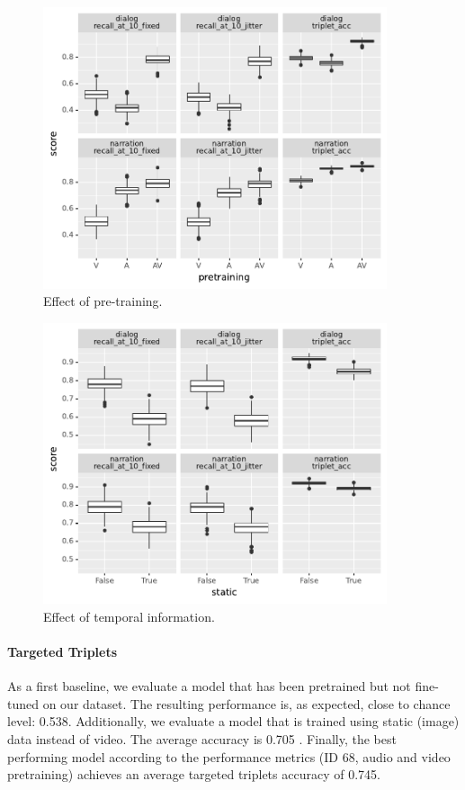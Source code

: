 \begin{figure}[htb]
  \centering
  \includegraphics[width=0.9\textwidth]{results/ablations/pretraining.pdf}
  \caption{Effect of pre-training.}
  \label{fig:pretraining}
\end{figure}

\begin{figure}[htb]
  \centering
  \includegraphics[width=0.9\textwidth]{results/ablations/static.pdf}
  \caption{Effect of temporal information.}
  \label{fig:static}
\end{figure}


\paragraph{Targeted Triplets}
As a first baseline, we evaluate a model that has been pretrained but not fine-tuned on our dataset. The resulting performance is, as expected, close to chance level: 0.538. Additionally, we evaluate a model that is trained using static (image) data instead of video. The average accuracy is 0.705 . Finally, the best performing model according to the
performance metrics (ID 68, audio and video pretraining) achieves an average
targeted triplets accuracy of 0.745.

